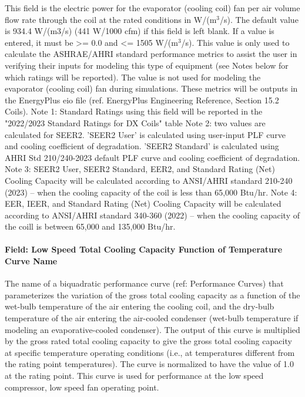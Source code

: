 This field is the electric power for the evaporator (cooling coil) fan per air volume flow rate through the coil at the rated conditions in W/(m\(^{3}\)/s). The default value is 934.4 W/(m3/s) (441 W/1000 cfm) if this field is left blank. If a value is entered, it must be \textgreater{}= 0.0 and \textless{}= 1505 W/(m\(^{3}\)/s). This value is only used to calculate the ASHRAE/AHRI standard performance metrics to assist the user in verifying their inputs for modeling this type of equipment (see Notes below for which ratings will be reported).  The value is not used for modeling the evaporator (cooling coil) fan during simulations.  These metrics will be outputs in the EnergyPlus eio file (ref. EnergyPlus Engineering Reference, Section 15.2 Coils). 
Note 1: Standard Ratings using this field will be reported in the "2022/2023 Standard Ratings for DX Coils" table
Note 2: two values are calculated for SEER2. 'SEER2 User' is calculated using user-input PLF curve and cooling coefficient of degradation. 'SEER2 Standard' is calculated using AHRI Std 210/240-2023 default PLF curve and cooling coefficient of degradation.
Note 3: SEER2 User, SEER2 Standard, EER2, and Standard Rating (Net) Cooling Capacity will be calculated according to ANSI/AHRI standard 210-240 (2023) -- when the cooling capacity of the coil is less than 65,000 Btu/hr.
Note 4: EER, IEER, and Standard Rating (Net) Cooling Capacity will be calculated according to ANSI/AHRI standard 340-360 (2022) -- when the cooling capacity of the coill is between 65,000 and 135,000 Btu/hr.

\paragraph{Field: Low Speed Total Cooling Capacity Function of Temperature Curve Name}\label{field-low-speed-total-cooling-capacity-function-of-temperature-curve-name}

The name of a biquadratic performance curve (ref: Performance Curves) that parameterizes the variation of the gross total cooling capacity as a function of the wet-bulb temperature of the air entering the cooling coil, and the dry-bulb temperature of the air entering the air-cooled condenser (wet-bulb temperature if modeling an evaporative-cooled condenser). The output of this curve is multiplied by the gross rated total cooling capacity to give the gross total cooling capacity at specific temperature operating conditions (i.e., at temperatures different from the rating point temperatures). The curve is normalized to have the value of 1.0 at the rating point. This curve is used for performance at the low speed compressor, low speed fan operating point.

